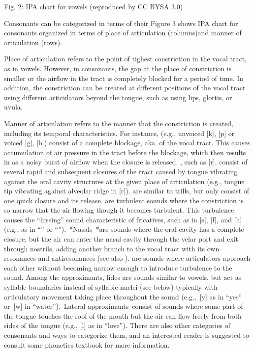 \documentclass[letterpaper,10pt,english]{jupyterBook}
\begin{document}
\sphinxAtStartPar
Fig. 2: IPA chart for vowels (reproduced by CC BY\sphinxhyphen{}SA 3.0)

\sphinxAtStartPar
Consonants can be categorized in terms of their  Figure 3 shows IPA chart for consonants organized in
terms of place of articulation (columns)and manner of articulation
(rows).

\sphinxAtStartPar
Place of articulation refers to the point of tighest constriction in the
vocal tract, as in vowels. However, in consonants, the gap at the place
of constriction is smaller or the airflow in the tract is completely
blocked for a period of time. In addition, the constriction can be
created at different positions of the vocal tract using different
articulators beyond the tongue, such as using lips, glottis, or uvula.

\sphinxAtStartPar
Manner of articulation refers to the manner that the constriction is
created, including its temporal characteristics. For instance,
 (e.g., unvoiced {[}k{]}, {[}p{]} or voiced {[}g{]}, {[}b{]}) consist
of a complete blockage, aka.  of the vocal tract. This causes
accumulation of air pressure in the tract before the blockage, which
then results in as a noisy burst of airflow when the closure is
released. , such as {[}r{]}, consist of several rapid
and subsequent closures of the tract caused by tongue vibrating against
the oral cavity structures at the given place of articulation (e.g.,
tongue tip vibrating against alveolar ridge in {[}r{]}). 
are similar to trills, but only consist of one quick closure and its
release.  are turbulent sounds where the constriction is so
narrow that the air flowing though it becomes turbulent. This turbulence
causes the “hissing” sound characteristic of fricatives, such as in
{[}s{]}, {[}f{]}, and {[}h{]} (e.g., as in “” or “”). *Nasals *are
sounds where the oral cavity has a complete closure, but the air can
enter the nasal cavity through the velar port and exit through nostrils,
adding another branch to the vocal tract with its own resonances and
antiresonances (see also {\hyperref[\detokenize{Introduction/Speech_production_and_acoustic_properties::doc}]{}}). 
are sounds where articulators approach each other without becoming
narrow enough to introduce turbulence to the sound. Among the
approximants, lides are sounds similar to vowels, but act as syllable
boundaries instead of syllabic nuclei (see below) typically with
articulatory movement taking place throughout the sound (e.g., {[}y{]} as
in “yes” or {[}w{]} in “water”). Lateral approximants consist of sounds
where some part of the tongue touches the roof of the mouth but the air
can flow freely from both sides of the tongue (e.g., {[}l{]} as in
“love”). There are also other categories of consonants and ways to
categorize them, and an interested reader is suggested to consult some
phonetics textbook for more information.
\end{document}
